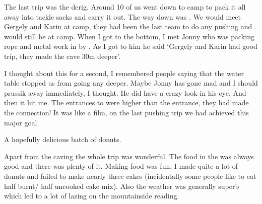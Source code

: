 The last trip was the derig. Around 10 of us went down to camp to pack it all away into tackle sacks and carry it out. The way down was . We would meet Gergely and Karin at camp, they had been the last team to do any pushing and would still be at camp. When I got to the bottom, I met Jonny who was packing rope and metal work in by . As I got to him he said ‘Gergely and Karin had good trip, they made the cave 30m deeper’.

I thought about this for a second, I remembered people saying that the water table stopped us from going any deeper. Maybe Jonny has gone mad and I should prussik away immediately, I thought. He did have a crazy look in his eye. And then it hit me. The entrances to  were higher than the  entrance, they had made the connection! It was like a film, on the last pushing trip we had achieved this major goal.

\begin{marginfigure}
\checkoddpage \ifoddpage \forcerectofloat \else \forceversofloat \fi
\centering
 \caption{A hopefully delicious batch of donuts. }
 \label{donuts}
\end{marginfigure}


Apart from the caving the whole trip was wonderful. The food in the  was always good and there was plenty of it. Making food was fun, I made quite a lot of donuts and failed to make nearly three cakes (incidentally some people like to eat half burnt/ half uncooked cake mix). Also the weather was generally superb which led to a lot of lazing on the mountainside reading.

